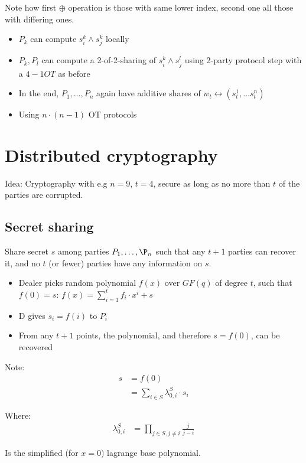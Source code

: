 Note how first $\oplus$ operation is those with same lower index, second one
all those with differing ones.

\begin{itemize}
		\item $P_k$ can compute $s^k_i \land s^k_j$ locally
		\item $P_k, P_l$ can compute a 2-of-2-sharing of $s^k_i \land s^l_j$
				using 2-party protocol step with a $4-1 OT$ as before
		\item In the end, $P_1, \ldots, P_n$ again have additive shares of $w_t \leftrightarrow (s^1_t, \ldots s^n_t)$
		\item Using $n \cdot (n - 1)$ OT protocols
\end{itemize}

\section{Distributed cryptography}

Idea: Cryptography with e.g $n = 9$, $t = 4$, secure as long as no more than
$t$ of the parties are corrupted.

\subsection{Secret sharing}

Share secret $s$ among parties $P_1, \ldots, \P_n$ such that any $t+1$ parties
can recover it, and no $t$ (or fewer) parties have any information on $s$.

\begin{itemize}
		\item Dealer picks random polynomial $f(x)$ over $GF(q)$ of degree $t$,
				such that $f(0) = s$: $f(x) = \sum_{i=1}^t f_i \cdot x^i + s$
		\item D gives $s_i = f(i)$ to $P_i$
		\item From any $t+1$ points, the polynomial, and therefore $s = f(0)$, can be recovered
\end{itemize}

Note:
\begin{align*}
		s & = f(0) \\
		  & = \sum_{i \in S} \lambda^S_{0, i} \cdot s_i
\end{align*}

Where:
\begin{align*}
		\lambda^S_{0, i} & = \prod_{j \in S, j \neq i} \frac{j}{j-i}
\end{align*}

Is the simplified (for $x = 0$) lagrange base polynomial.
